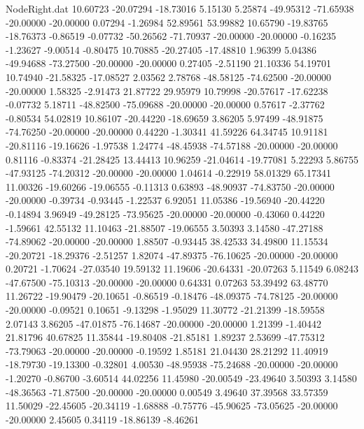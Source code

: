 \begin{filecontents}{NodeRight.dat}
  10.60723  -20.07294  -18.73016     5.15130    5.25874  -49.95312  -71.65938  -20.00000  -20.00000    0.07294   -1.26984   52.89561   53.99882
  10.65790  -19.83765  -18.76373    -0.86519   -0.07732  -50.26562  -71.70937  -20.00000  -20.00000   -0.16235   -1.23627   -9.00514   -0.80475
  10.70885  -20.27405  -17.48810     1.96399    5.04386  -49.94688  -73.27500  -20.00000  -20.00000    0.27405   -2.51190   21.10336   54.19701
  10.74940  -21.58325  -17.08527     2.03562    2.78768  -48.58125  -74.62500  -20.00000  -20.00000    1.58325   -2.91473   21.87722   29.95979
  10.79998  -20.57617  -17.62238    -0.07732    5.18711  -48.82500  -75.09688  -20.00000  -20.00000    0.57617   -2.37762   -0.80534   54.02819
  10.86107  -20.44220  -18.69659     3.86205    5.97499  -48.91875  -74.76250  -20.00000  -20.00000    0.44220   -1.30341   41.59226   64.34745
  10.91181  -20.81116  -19.16626    -1.97538    1.24774  -48.45938  -74.57188  -20.00000  -20.00000    0.81116   -0.83374  -21.28425   13.44413
  10.96259  -21.04614  -19.77081     5.22293    5.86755  -47.93125  -74.20312  -20.00000  -20.00000    1.04614   -0.22919   58.01329   65.17341
  11.00326  -19.60266  -19.06555    -0.11313    0.63893  -48.90937  -74.83750  -20.00000  -20.00000   -0.39734   -0.93445   -1.22537    6.92051
  11.05386  -19.56940  -20.44220    -0.14894    3.96949  -49.28125  -73.95625  -20.00000  -20.00000   -0.43060    0.44220   -1.59661   42.55132
  11.10463  -21.88507  -19.06555     3.50393    3.14580  -47.27188  -74.89062  -20.00000  -20.00000    1.88507   -0.93445   38.42533   34.49800
  11.15534  -20.20721  -18.29376    -2.51257    1.82074  -47.89375  -76.10625  -20.00000  -20.00000    0.20721   -1.70624  -27.03540   19.59132
  11.19606  -20.64331  -20.07263     5.11549    6.08243  -47.67500  -75.10313  -20.00000  -20.00000    0.64331    0.07263   53.39492   63.48770
  11.26722  -19.90479  -20.10651    -0.86519   -0.18476  -48.09375  -74.78125  -20.00000  -20.00000   -0.09521    0.10651   -9.13298   -1.95029
  11.30772  -21.21399  -18.59558     2.07143    3.86205  -47.01875  -76.14687  -20.00000  -20.00000    1.21399   -1.40442   21.81796   40.67825
  11.35844  -19.80408  -21.85181     1.89237    2.53699  -47.75312  -73.79063  -20.00000  -20.00000   -0.19592    1.85181   21.04430   28.21292
  11.40919  -18.79730  -19.13300    -0.32801    4.00530  -48.95938  -75.24688  -20.00000  -20.00000   -1.20270   -0.86700   -3.60514   44.02256
  11.45980  -20.00549  -23.49640     3.50393    3.14580  -48.36563  -71.87500  -20.00000  -20.00000    0.00549    3.49640   37.39568   33.57359
  11.50029  -22.45605  -20.34119    -1.68888   -0.75776  -45.90625  -73.05625  -20.00000  -20.00000    2.45605    0.34119  -18.86139   -8.46261

\end{filecontents}
